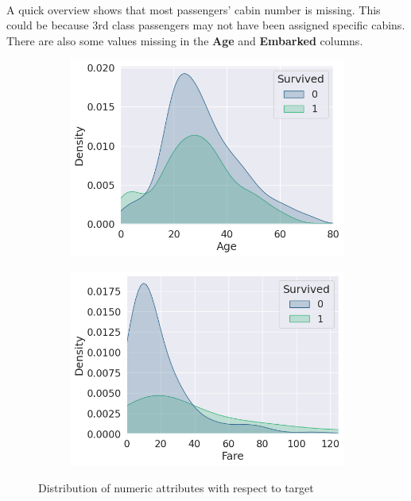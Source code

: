 \documentclass{article}
\begin{document}
\paragraph{} A quick overview shows that most passengers' cabin number is missing. This could be because 3rd class passengers may not have been assigned specific cabins. There are also some values missing in the \textbf{Age} and \textbf{Embarked} columns.
\begin{figure}[htb]
    \centering
    \begin{subfigure}
        \centering
        \includegraphics[width=0.49\linewidth]{age.png}
    \end{subfigure}
    \begin{subfigure}
        \centering
        \includegraphics[width=0.49\linewidth]{fare.png}
    \end{subfigure}
    \caption{Distribution of numeric attributes with respect to target}
    \label{fig:enter-label}
\end{figure}
\end{document}
